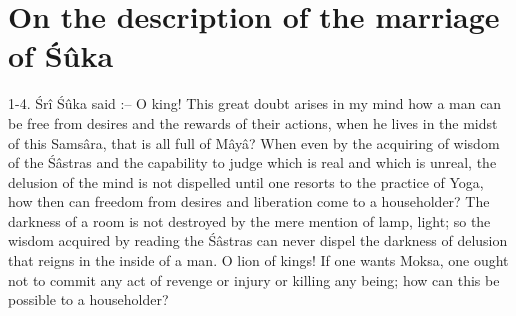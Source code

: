 \chapter{On the description of the marriage of \'S\^uka}

1-4. \'Sr\^i \'S\^uka said :-- O king! This great doubt arises in my mind how a man can be free from desires and the rewards of their actions, when he lives in the midst of this Sams\^ara, that is all full of M\^ay\^a? When even by the acquiring of wisdom of the \'S\^astras and the capability to judge which is real and which is unreal, the delusion of the mind is not dispelled until one resorts to the practice of Yoga, how then can freedom from desires and liberation come to a householder? The darkness of a room is not destroyed by the mere mention of lamp, light; so the wisdom acquired by reading the \'S\^astras can never dispel the darkness of delusion that reigns in the inside of a man. O lion of kings! If one wants Moksa, one ought not to commit any act of revenge or injury or killing any being; how can this be possible to a householder?

